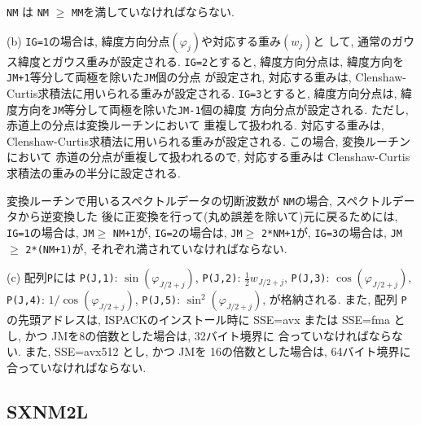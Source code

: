 \documentclass[a4j]{jsarticle}
\begin{document}
\begin{enumerate}
\texttt{NM} は \texttt{NM} $\ge$ \texttt{MM}を満していなければならない.

(b) \texttt{IG=1}の場合は, 緯度方向分点$(\varphi_j)$や対応する重み$(w_j)$と
して, 通常のガウス緯度とガウス重みが設定される.
\texttt{IG=2}とすると, 緯度方向分点は, 
緯度方向を\texttt{JM+1}等分して両極を除いた\texttt{JM}個の分点
が設定され, 対応する重みは, Clenshaw-Curtis求積法に用いられる重みが設定される.
\texttt{IG=3}とすると, 緯度方向分点は, 
緯度方向を\texttt{JM}等分して両極を除いた\texttt{JM-1}個の緯度
方向分点が設定される. ただし, 赤道上の分点は変換ルーチンにおいて
重複して扱われる.
対応する重みは, Clenshaw-Curtis求積法に用いられる重みが設定される.
この場合, 変換ルーチンにおいて
赤道の分点が重複して扱われるので, 対応する重みは
Clenshaw-Curtis求積法の重みの半分に設定される.

変換ルーチンで用いるスペクトルデータの切断波数が
\texttt{NM}の場合, スペクトルデータから逆変換した
後に正変換を行って(丸め誤差を除いて)元に戻るためには,
\texttt{IG=1}の場合は, \texttt{JM}$\ge$ \texttt{NM+1}が,
\texttt{IG=2}の場合は, \texttt{JM}$\ge$ \texttt{2*NM+1}が,
\texttt{IG=3}の場合は, \texttt{JM}$\ge$ \texttt{2*(NM+1)}が,
それぞれ満されていなければならない.

(c) 配列\texttt{P}には
   \texttt{P(J,1)}:  $\sin(\varphi_{J/2+j})$,
   \texttt{P(J,2)}:  $\frac12 w_{J/2+j}$, 
   \texttt{P(J,3)}:  $\cos(\varphi_{J/2+j})$,
   \texttt{P(J,4)}:  $1/\cos(\varphi_{J/2+j})$,
   \texttt{P(J,5)}:  $\sin^2(\varphi_{J/2+j})$,
が格納される. また, 配列 \texttt{P}の先頭アドレスは, 
ISPACKのインストール時に SSE=avx または SSE=fma とし, かつ
JMを8の倍数とした場合は, 32バイト境界に
合っていなければならない.
また, SSE=avx512 とし, かつ
JMを 16の倍数とした場合は, 64バイト境界に
合っていなければならない.


\end{enumerate}


\subsection{SXNM2L}
\end{document}
